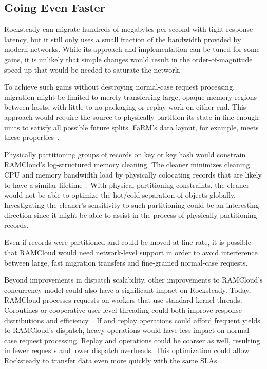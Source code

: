 \subsection{Going Even Faster}

Rocksteady can migrate hundreds of megabytes per second with tight response
latency, but it still only uses a small fraction of the bandwidth provided by
modern networks. While its approach and implementation can be tuned for
some gains, it is unlikely that simple changes would result in the
order-of-magnitude speed up that would be needed to saturate the network.

To achieve such gains without destroying normal-case request processing,
migration might be limited to merely transferring large, opaque memory regions
between hosts, with little-to-no packaging or replay work on either end. This
approach would require the source to physically partition its state in fine
enough units to satisfy all possible future splits. FaRM's data
layout, for example, meets these properties~\cite{farm-txns}.

Physically partitioning groups of records on key or key hash would constrain
RAMCloud's log-structured memory cleaning. The cleaner minimizes cleaning CPU
and memory bandwidth load by physically colocating records that are likely to
have a similar lifetime~\cite{ramcloud-lsm}.  With physical partitioning constraints, the cleaner
would not be able to optimize the hot/cold separation of objects globally.
Investigating the cleaner's sensitivity to such partitioning could be an
interesting direction since it might be able to assist in the
process of physically partitioning records.

Even if records were partitioned and could be moved at line-rate, it is possible
that RAMCloud would need network-level support in order to avoid interference
between large, fast migration transfers and fine-grained normal-case requests.

Beyond improvements in dispatch scalability, other improvements to
RAMCloud's concurrency model could also have a significant impact on
Rocksteady.  Today, RAMCloud processes requests on workers that use standard
kernel threads.  Coroutines or cooperative user-level threading could both
improve response distributions and efficiency~\cite{fasst-2016}. If \pull and replay operations
could afford frequent yields to RAMCloud's dispatch, heavy operations would
have less impact on normal-case request processing. Replay and \pull operations
could be coarser as well, resulting in fewer requests and lower dispatch
overheads. This optimization could allow Rocksteady to transfer data even more quickly with
the same SLAs.

